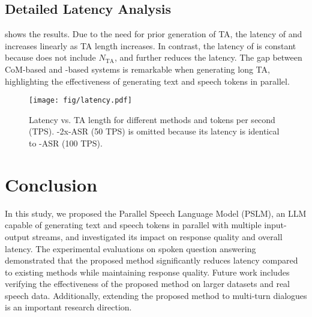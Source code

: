 \subsection{Detailed Latency Analysis}
 shows the results.
Due to the need for prior generation of TA, the latency of  and  increases linearly as TA length increases.
In contrast, the latency of  is constant because  does not include $N_\textrm{TA}$, and  further reduces the latency.
The gap between CoM-based and \prop-based systems is remarkable when generating long TA, highlighting the effectiveness of generating text and speech tokens in parallel.

\begin{figure}[t]
    \begin{center}
  \texttt{[image: fig/latency.pdf]}
    \vspace{-20pt}
    \caption{Latency vs. TA length for different methods and tokens per second (TPS). \prop-2x-ASR (50 TPS) is omitted because its latency is identical to \prop-ASR (100 TPS).}
    \label{fig:latency_vs_TAlen}
    \end{center}
    \vspace{-10pt}
\end{figure}

\section{Conclusion}
In this study, we proposed the Parallel Speech Language Model (PSLM), an LLM capable of generating text and speech tokens in parallel with multiple input-output streams, and investigated its impact on response quality and overall latency.
The experimental evaluations on spoken question answering demonstrated that the proposed method significantly reduces latency compared to existing methods while maintaining response quality.
Future work includes verifying the effectiveness of the proposed method on larger datasets and real speech data.
Additionally, extending the proposed method to multi-turn dialogues is an important research direction.

